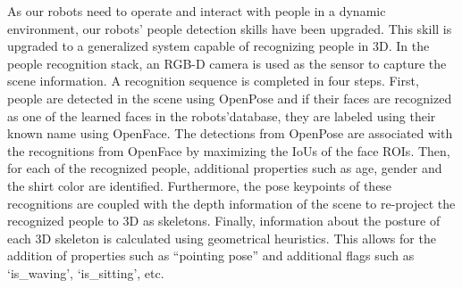\label{sec:pers_recog}
As our robots need to operate and interact with people in a dynamic environment, our robots’ people detection skills have been upgraded. This skill is upgraded to a generalized system capable of recognizing people in 3D. In the people recognition stack, an RGB-D camera is used as the sensor to capture the scene information. A recognition sequence is completed in four steps. First, people are detected in the scene using OpenPose and if their faces are recognized as one of the learned faces in the robots'database, they are labeled using their known name using OpenFace. The detections from OpenPose are associated with the recognitions from OpenFace by maximizing the IoUs of the face ROIs. Then, for each of the recognized people, additional properties such as age, gender and the shirt color are identified. Furthermore, the pose keypoints of these recognitions are coupled with the depth information of the scene to re-project the recognized people to 3D as skeletons. Finally, information about the posture of each 3D skeleton is calculated using geometrical heuristics. This allows for the addition of properties such as “pointing pose” and additional flags such as `is\_waving', `is\_sitting', etc.
%
